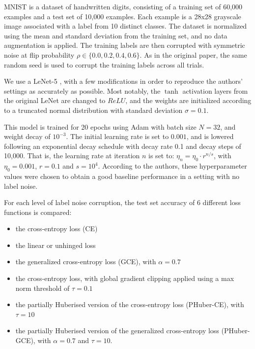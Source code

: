 MNIST is a dataset of handwritten digits, consisting of a training set of 60,000 examples and a test set of 10,000 examples. Each example is a 28x28 grayscale image associated with a label from 10 distinct classes. The dataset is normalized using the mean and standard deviation from the training set, and no data augmentation is applied. The training labels are then corrupted with symmetric noise at flip probability $\rho \in \{0.0,0.2,0.4,0.6\}$. As in the original paper, the same random seed is used to corrupt the training labels across all trials.

We use a LeNet-5 \citep{lecun_gradient-based_1998}, with a few modifications in order to reproduce the authors' settings as accurately as possible. Most notably, the $\tanh$ activation layers from the original LeNet are changed to $ReLU$, and the weights are initialized according to a truncated normal distribution with standard deviation $\sigma = 0.1$. 

This model is trained for 20 epochs using Adam \citep{kingma_adam_2017} with batch size $N=32$, and weight decay of $10^{-3}$. The initial learning rate is set to $0.001$, and is lowered  following an exponential decay schedule with decay rate 0.1 and decay steps of 10,000. That is, the learning rate at iteration $n$ is set to: $\eta_{n} = \eta_{0} \cdot r^{n/s}$, with $\eta_{0} = 0.001$, $r = 0.1$ and $s=10^4$. According to the authors, these hyperparameter values were chosen to obtain a good baseline performance in a setting with no label noise.

For each level of label noise corruption, the test set accuracy of 6 different loss functions is compared: 
\begin{itemize}[noitemsep]
    \item the cross-entropy loss (CE)
    \item the linear or unhinged loss \citep{van_rooyen_learning_2015}
    \item the generalized cross-entropy loss (GCE), with $\alpha=0.7$ \citep{zhang_generalized_2018}
    \item the cross-entropy loss, with global gradient clipping applied using a max norm threshold of $\tau=0.1$ 
    \item the partially Huberised version of the cross-entropy loss (PHuber-CE), with $\tau=10$
    \item the partially Huberised version of the generalized cross-entropy loss (PHuber-GCE), with $\alpha=0.7$ and $\tau=10$.
\end{itemize}


